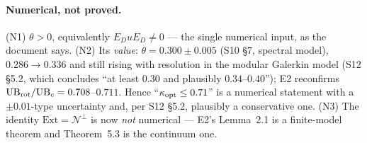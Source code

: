 \documentclass[11pt]{article}
\newcommand{\Ext}{\mathrm{Ext}}\newcommand{\Nvis}{\mathcal N}
\begin{document}
\paragraph{Numerical, not proved.}
(N1) $\theta>0$, equivalently $E_DuE_D\ne0$ --- the single numerical input, as the document
says.  (N2) Its \emph{value}: $\theta=0.300\pm0.005$ (S10 \S7, spectral model), $0.286\to0.336$
and still rising with resolution in the modular Galerkin model (S12 \S5.2, which concludes
``at least $0.30$ and plausibly $0.34$--$0.40$''); E2 reconfirms
$\mathrm{UB}_{\rm rot}/\mathrm{UB}_c=0.708$--$0.711$.  Hence ``$\kappa_{\rm opt}\le0.71$''
is a numerical statement with a $\pm0.01$-type uncertainty and, per S12 \S5.2, plausibly a
conservative one.  (N3) The identity $\overline{\Ext}=\Nvis^{\perp}$ is now \emph{not}
numerical --- E2's Lemma~2.1 is a finite-model theorem and Theorem~5.3 is the continuum one.
\end{document}
